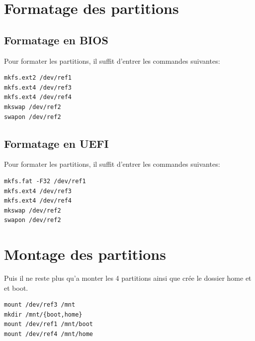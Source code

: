 \documentclass[a4paper]{book}
\begin{document}
\section{Formatage des partitions}
\subsection{Formatage en BIOS}
Pour formater les partitions, il suffit d'entrer les commandes suivantes:\\
\begin{lstlisting}
mkfs.ext2 /dev/ref1
mkfs.ext4 /dev/ref3
mkfs.ext4 /dev/ref4
mkswap /dev/ref2
swapon /dev/ref2
\end{lstlisting}
\subsection{Formatage en UEFI}
Pour formater les partitions, il suffit d'entrer les commandes suivantes:\\
\begin{lstlisting}
mkfs.fat -F32 /dev/ref1
mkfs.ext4 /dev/ref3
mkfs.ext4 /dev/ref4
mkswap /dev/ref2
swapon /dev/ref2
\end{lstlisting}
\section{Montage des partitions}
Puis il ne reste plus qu'a monter les 4 partitions ainsi que crée le dossier
home et et boot.\\
\begin{lstlisting}
mount /dev/ref3 /mnt
mkdir /mnt/{boot,home}
mount /dev/ref1 /mnt/boot
mount /dev/ref4 /mnt/home
\end{lstlisting}
\end{document}
